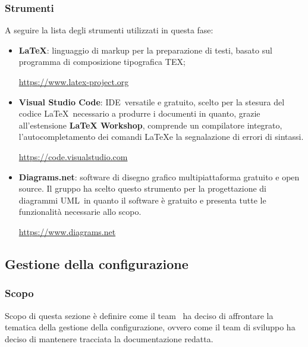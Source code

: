 \subsubsection{Strumenti}
A seguire la lista degli strumenti utilizzati in questa fase:
\begin{itemize}
    \item \textbf{\LaTeX}: linguaggio di markup per la preparazione di testi, basato sul programma di composizione tipografica TEX;
         \begin{center}\url{https://www.latex-project.org}\end{center}
    \item \textbf{Visual Studio Code}: IDE\glo\ versatile e gratuito, scelto per la stesura del codice \LaTeX\ necessario a produrre i documenti in quanto, grazie all'estensione \textbf{LaTeX Workshop}, comprende un compilatore integrato, l'autocompletamento dei comandi \LaTeX e la segnalazione di errori di sintassi.
        \begin{center}\url{https://code.visualstudio.com}\end{center}
    \item \textbf{Diagrams.net}: software di disegno grafico multipiattaforma gratuito e open source. Il gruppo ha scelto questo strumento per la progettazione di diagrammi UML\glo\ in quanto il software è gratuito e presenta tutte le funzionalità necessarie allo scopo.
        \begin{center}\url{https://www.diagrams.net}\end{center}
    
\end{itemize}

\pagebreak

\subsection{Gestione della configurazione}\label{subsection:gestione_configurazione}
    \subsubsection{Scopo}
    Scopo di questa sezione è definire come il team \groupName\ ha deciso di affrontare la tematica della gestione della configurazione, ovvero come il team di sviluppo ha deciso di mantenere tracciata la documentazione redatta.

